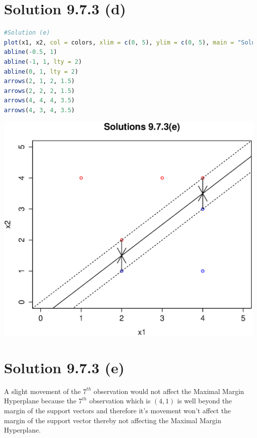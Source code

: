 \documentclass[a4paper,10pt]{article}
\begin{document}
\section{Solution 9.7.3 (d)}
\begin{lstlisting}[language=R]
#Solution (e)
plot(x1, x2, col = colors, xlim = c(0, 5), ylim = c(0, 5), main = "Solutions 9.7.3(e)")
abline(-0.5, 1)
abline(-1, 1, lty = 2)
abline(0, 1, lty = 2)
arrows(2, 1, 2, 1.5)
arrows(2, 2, 2, 1.5)
arrows(4, 4, 4, 3.5)
arrows(4, 3, 4, 3.5)
\end{lstlisting}
\begin{center}
\includegraphics[scale=0.70]{support}
\end{center}

\section{Solution 9.7.3 (e)}
A slight movement of the $7^{th}$ observation would not affect the Maximal Margin Hyperplane because the $7^{th}$ observation which is $(4,1)$ is well beyond the
margin of the support vectors and therefore it's movement won't affect the margin of the support vector thereby not affecting the Maximal
Margin Hyperplane.
\end{document}
